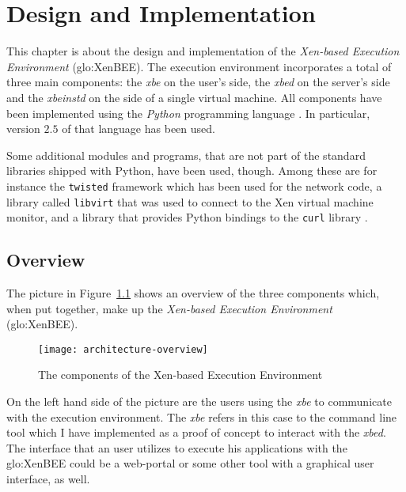 
\chapter{Design and Implementation}
\label{cha:design}

This chapter is about the design and implementation of the \emph{Xen-based
  Execution  Environment} (\gls{glo:XenBEE}).   The  execution environment
incorporates  a total  of three  main  components: the  \emph{xbe} on  the
user's side, the \emph{xbed} on  the server's side and the \emph{xbeinstd}
on  the  side of  a  single virtual  machine.   All  components have  been
implemented     using    the     \emph{Python}     programming    language
\cite{python-language}. In particular, version  $2.5$ of that language has
been used.

Some additional  modules and programs, that  are not part  of the standard
libraries shipped with Python, have been used, though. Among these are for
instance  the \texttt{twisted}  framework \cite{twisted-python}  which has
been  used  for  the  network  code,  a  library  called  \texttt{libvirt}
\cite{libvirt}  that  was used  to  connect  to  the Xen  virtual  machine
monitor, and a library that  provides Python bindings to the \texttt{curl}
library \cite{pycurl}.


\section{Overview}
\label{sec:design:overview}

The picture in Figure~\ref{fig:architecture-overview} shows an overview of
the three components which, when put together, make up the \emph{Xen-based
  Execution Environment} (\gls{glo:XenBEE}).

\begin{figure}[ht]
  \centering
  \texttt{[image: architecture-overview]}
  \caption[Overview of the  \gls{glo:XenBEE} components]{The components of
    the Xen-based Execution Environment}
  \label{fig:architecture-overview}
\end{figure}

On the left hand side of the picture are the users using the \emph{xbe} to
communicate with the execution  environment. The \emph{xbe} refers in this
case  to the command  line tool  which I  have implemented  as a  proof of
concept  to interact  with the  \emph{xbed}.  The  interface that  an user
utilizes to execute his applications  with the \gls{glo:XenBEE} could be a
web-portal or some other tool with a graphical user interface, as well.

